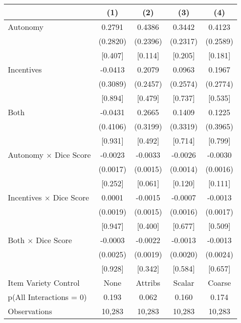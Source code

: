 \begin{tabular}{l*{4}{c}}
\toprule
                     &\multicolumn{1}{c}{(1)}&\multicolumn{1}{c}{(2)}&\multicolumn{1}{c}{(3)}&\multicolumn{1}{c}{(4)}\\
\midrule
Autonomy             &      0.2791&      0.4386&      0.3442&      0.4123\\
                     &    (0.2820)&    (0.2396)&    (0.2317)&    (0.2589)\\
                     &     [0.407]&     [0.114]&     [0.205]&     [0.181]\\\addlinespace
Incentives           &     -0.0413&      0.2079&      0.0963&      0.1967\\
                     &    (0.3089)&    (0.2457)&    (0.2574)&    (0.2774)\\
                     &     [0.894]&     [0.479]&     [0.737]&     [0.535]\\\addlinespace
Both                 &     -0.0431&      0.2665&      0.1409&      0.1225\\
                     &    (0.4106)&    (0.3199)&    (0.3319)&    (0.3965)\\
                     &     [0.931]&     [0.492]&     [0.714]&     [0.799]\\\addlinespace
Autonomy $\times$ Dice Score&     -0.0023&     -0.0033&     -0.0026&     -0.0030\\
                     &    (0.0017)&    (0.0015)&    (0.0014)&    (0.0016)\\
                     &     [0.252]&     [0.061]&     [0.120]&     [0.111]\\\addlinespace
Incentives $\times$ Dice Score&      0.0001&     -0.0015&     -0.0007&     -0.0013\\
                     &    (0.0019)&    (0.0015)&    (0.0016)&    (0.0017)\\
                     &     [0.947]&     [0.400]&     [0.677]&     [0.509]\\\addlinespace
Both $\times$ Dice Score&     -0.0003&     -0.0022&     -0.0013&     -0.0013\\
                     &    (0.0025)&    (0.0019)&    (0.0020)&    (0.0024)\\
                     &     [0.928]&     [0.342]&     [0.584]&     [0.657]\\
\midrule
Item Variety Control &        None&     Attribs&      Scalar&      Coarse\\
p(All Interactions = 0)&       0.193&       0.062&       0.160&       0.174\\
Observations         &      10,283&      10,283&      10,283&      10,283\\
\bottomrule
\end{tabular}
